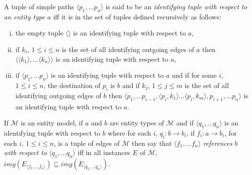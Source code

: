 \documentclass[10pt,a4paper]{article}
\newcommand{\term}[1]{\textit{{#1}}}
\newcommand{\genericmodel}{\mathcal{M}}
\begin{document}
\begin{definition}
A tuple of simple paths $\langle p_1,...p_n \rangle$ is said to be an 
\term{identifying tuple with respect to an entity type $a$}
iff it is in the set of tuples defined recursively as follows:
\begin{enumerate}[(i)]
\item{
the empty tuple $\langle \rangle$ is an identifying tuple with respect to $a$,
}

\item{
if $k_i$, $1 \leq i \leq n$ is the set of all identifying outgoing edges of $a$ then
$\langle \langle k_1 \rangle ,... \langle k_n \rangle \rangle$ is an identifying tuple with respect to $a$,
}

\item{
if $\langle p_1,...p_n \rangle$ is an identifying tuple with respect to $a$ and if for some $i$, $1 \leq i \leq n$, the
destination of $p_i$ is $b$ and if $k_j$, $1 \leq j \leq m$ is the set of all identifying outgoing edges of $b$
then $\langle p_1,...p_{i-1},\langle p_i,k_1 \rangle ... \langle p_i,k_m \rangle, p_{i+1},...p_n \rangle$ is an identifying tuple with respect to $a$.
}

\end{enumerate}

\end{definition}


\begin{definition}
If $\genericmodel$ is an entity model, 
if $a$ and $b$ are entity types of  $\genericmodel$ and  if $\langle q_1,...q_n \rangle$
is an identifying tuple with respect to $b$
 where for each $i$, $q_i: b \rightarrow b_i$,
if  $f_i: a \rightarrow b_i$,  for each $i$,  $1 \leq i \leq n$, is a tuple of edges of $\genericmodel$ 
then say that $\langle f_1,...f_n \rangle$ \term{references $b$ with respect to $\langle q_1,...q_n \rangle$} iff in all instances $E$ of $\genericmodel$,
$img(E_{\langle f_1,...f_n \rangle}) \subseteq img(E_{\langle q_1,...q_n \rangle})$. 
\end{definition}
\end{document}
